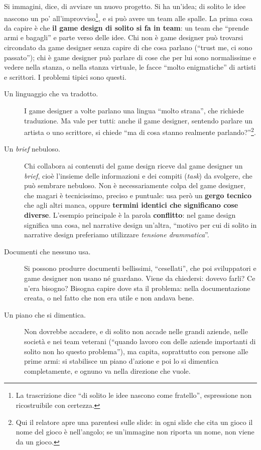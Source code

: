 Si immagini, dice, di avviare un nuovo progetto. Si ha un'idea; di solito le
idee nascono un po' all'improvviso\footnote{La trascrizione dice ``di solito le
idee nascono come fratello'', espressione non ricostruibile con certezza.}, e
si può avere un team alle spalle. La prima cosa da capire è che \textbf{il
game design di solito si fa in team}: un team che ``prende armi e bagagli'' e
parte verso delle idee. Chi non è game designer può trovarsi circondato da game
designer senza capire di che cosa parlano (``trust me, ci sono passato''); chi
è game designer può parlare di cose che per lui sono normalissime e vedere
nella stanza, o nella stanza virtuale, le facce ``molto enigmatiche'' di
artisti e scrittori. I problemi tipici sono questi.
\begin{description}
  \item[Un linguaggio che va tradotto.] I game designer a volte parlano una
        lingua ``molto strana'', che richiede traduzione. Ma vale per tutti:
        anche il game designer, sentendo parlare un artista o uno scrittore, si
        chiede ``ma di cosa stanno realmente parlando?''\footnote{Qui il
        relatore apre una parentesi sulle slide: in ogni slide che cita un gioco
        il nome del gioco è nell'angolo; se un'immagine non riporta un nome, non
        viene da un gioco.}.
  \item[Un \emph{brief} nebuloso.] Chi collabora ai contenuti del game design
        riceve dal game designer un \emph{brief}, cioè l'insieme delle
        informazioni e dei compiti (\emph{task}) da svolgere, che può sembrare
        nebuloso. Non è necessariamente colpa del game designer, che magari è
        tecnicissimo, preciso e puntuale: usa però un \textbf{gergo tecnico}
        che agli altri manca, oppure \textbf{termini identici che significano
        cose diverse}. L'esempio principale è la parola \textbf{conflitto}: nel
        game design significa una cosa, nel narrative design un'altra, ``motivo
        per cui di solito in narrative design preferiamo utilizzare
        \emph{tensione drammatica}''.
  \item[Documenti che nessuno usa.] Si possono produrre documenti bellissimi,
        ``cesellati'', che poi sviluppatori e game designer non usano né
        guardano. Viene da chiedersi: dovevo farli? Ce n'era bisogno? Bisogna
        capire dove sta il problema: nella documentazione creata, o nel fatto
        che non era utile e non andava bene.
  \item[Un piano che si dimentica.] Non dovrebbe accadere, e di solito non
        accade nelle grandi aziende, nelle società e nei team veterani (``quando
        lavoro con delle aziende importanti di solito non ho questo
        problema''), ma capita, soprattutto con persone alle prime armi: si
        stabilisce un piano d'azione e poi lo si dimentica completamente, e
        ognuno va nella direzione che vuole.
\end{description}

